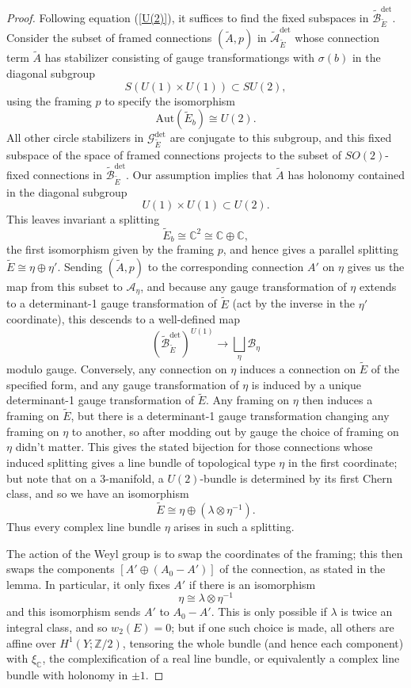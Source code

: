 \documentclass[10pt,a4paper]{amsart}
\theoremstyle{definition}
\theoremstyle{remark}
\numberwithin{figure}{qchap}
\begin{document}
\begin{proof}Following equation (\ref{U(2)}), it suffices to find the fixed subspaces in $\widetilde{\mathcal B}_{\tilde E}^{\text{det}}$. Consider the subset of framed connections $(\tilde A, p)$ in $\widetilde{\mathcal A}_{\tilde E}^{\det}$ whose connection term $\tilde A$ has stabilizer consisting of gauge transformationgs with $\sigma(b)$ in the diagonal subgroup $$S(U(1) \times U(1)) \subset SU(2),$$ using the framing $p$ to specify the isomorphism $$\text{Aut}(\tilde E_b) \cong U(2).$$ All other circle stabilizers in $\mathcal G_{\tilde E}^{\text{det}}$ are conjugate to this subgroup, and this fixed subspace of the space of framed connections projects to the subset of $SO(2)$-fixed connections in $\widetilde{\mathcal B}_{\tilde E}^{\text{det}}$. Our assumption implies that $\tilde A$ has holonomy contained in the diagonal subgroup 
$$U(1) \times U(1) \subset U(2).$$ This leaves invariant a splitting $$\tilde E_b \cong \mathbb C^2 \cong \mathbb C \oplus \mathbb C,$$ the first isomorphism given by the framing $p$, and hence gives a parallel splitting $\tilde E \cong \eta \oplus \eta'$. Sending $(\tilde A, p)$ to the corresponding connection $A'$ on $\eta$ gives us the map from this subset to $\mathcal A_\eta$, and because any gauge transformation of $\eta$ extends to a determinant-1 gauge transformation of $\tilde E$ (act by the inverse in the $\eta'$ coordinate), this descends to a well-defined map $$\left(\widetilde{\mathcal B}_{\tilde E}^{\text{det}}\right)^{U(1)} \to \bigsqcup_\eta \mathcal B_\eta$$ modulo gauge. Conversely, any connection on $\eta$ induces a connection on $\tilde E$ of the specified form, and any gauge transformation of $\eta$ is induced by a unique determinant-1 gauge transformation of $\tilde E$. Any framing on $\eta$ then induces a framing on $\tilde E$, but there is a determinant-1 gauge transformation changing any framing on $\eta$ to another, so after modding out by gauge the choice of framing on $\eta$ didn't matter. This gives the stated bijection for those connections whose induced splitting gives a line bundle of topological type $\eta$ in the first coordinate; but note that on a 3-manifold, a $U(2)$-bundle is determined by its first Chern class, and so we have an isomorphism $$\tilde E \cong \eta \oplus (\lambda \otimes \eta^{-1}).$$ Thus every complex line bundle $\eta$ arises in such a splitting.

The action of the Weyl group is to swap the coordinates of the framing; this then swaps the components $[A' \oplus (A_0 - A')]$ of the connection, as stated in the lemma. In particular, it only fixes $A'$ if there is an isomorphism $$\eta \cong \lambda \otimes \eta^{-1}$$ and this isomorphism sends $A'$ to $A_0 - A'$. This is only possible if $\lambda$ is twice an integral class, and so $w_2(E) = 0$; but if one such choice is made, all others are affine over $H^1(Y;\mathbb Z/2)$, tensoring the whole bundle (and hence each component) with $\xi_{\mathbb C}$, the complexification of a real line bundle, or equivalently a complex line bundle with holonomy in $\pm 1$.\end{proof}
\end{document}
